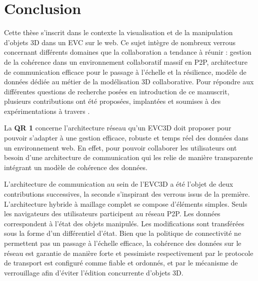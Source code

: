 \chapter{Conclusion}
\chaptertable

Cette thèse s'inscrit dans le contexte la visualisation et de la manipulation d'objets 
3D dans un \gls{EVC} sur le web. Ce sujet intègre de nombreux verrous 
concernant différents domaines que la collaboration a tendance à réunir : gestion 
de la cohérence dans un environnement collaboratif massif en \gls{P2P}, 
architecture de communication efficace pour le passage à l'échelle et la résilience, 
modèle de données dédiée au métier de la modélisation 3D collaborative. 
Pour répondre aux différentes questions de 
recherche posées en introduction de ce manuscrit, plusieurs contributions ont été 
proposées, implantées et soumises à des expérimentations à travers 
\cite{Desprat2015a,Desprat2015b,Desprat2016,Desprat2017}. 

La \textbf{QR 1} concerne l'architecture réseau qu'un \gls{EVC3D} doit proposer 
pour 
pouvoir s'adapter à une gestion efficace, robuste et temps réel des données dans 
un environnement web. En effet, pour pouvoir collaborer les utilisateurs ont besoin 
d'une architecture de communication qui les relie de manière transparente 
intégrant un modèle de cohérence des données. 

L'architecture de communication au sein de l'\gls{EVC3D} a été l'objet de deux 
contributions successives, la seconde s'inspirant des verrous issus de la 
première. 
L'architecture hybride à maillage complet se compose d'éléments 
simples. 
Seuls 
les navigateurs des utilisateurs participent au réseau \gls{P2P}. Les données 
correspondent à l'état des objets manipulés. Les modifications sont transférées 
sous la forme d'un différentiel d'état. Bien que la politique de connectivité ne 
permettent pas un passage à l'échelle efficace, la cohérence des données sur le 
réseau est garantie de manière forte et pessimiste respectivement par le protocole 
de transport est configuré comme fiable et ordonnés, et par le mécanisme de 
verrouillage afin d'éviter l'édition concurrente d'objets 3D.

